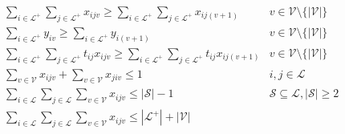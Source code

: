 \begin{eqnarray}
	    & \displaystyle\sum_{i\in \mathcal{L}^+}\displaystyle\sum_{j\in \mathcal{L}^+} x_{ijv} \geq \displaystyle\sum_{i\in \mathcal{L}^+}\displaystyle\sum_{j\in \mathcal{L}^+} x_{ij(v+1)} & v \in \mathcal{V} \setminus\{| \mathcal{V}|\} \label{eq:const_number_of_arcs}\\
	    & \displaystyle\sum_{i\in \mathcal{L}^+} y_{iv} \geq \displaystyle\sum_{i\in \mathcal{L}^+} y_{i(v+1)} & v \in \mathcal{V} \setminus\{| \mathcal{V}|\} \label{eq:const_number_of_visits} \\
	    & \displaystyle\sum_{i\in \mathcal{L}^+}\displaystyle\sum_{j\in \mathcal{L}^+} t_{ij}x_{ijv} \geq \displaystyle\sum_{i\in \mathcal{L}^+}\displaystyle\sum_{j\in \mathcal{L}^+} t_{ij}x_{ij(v+1)} & v \in \mathcal{V} \setminus\{| \mathcal{V}|\} \label{eq:const_total_time_used}\\
	    & \displaystyle\sum_{v\in \mathcal{V}} x_{ijv} + \displaystyle\sum_{v\in \mathcal{V}} x_{jiv} \leq 1 & i,j \in \mathcal{L} \label{eq:const_back_and_forth}\\
	    & \displaystyle\sum_{i\in \mathcal{L}} \displaystyle\sum_{j\in \mathcal{L}} \displaystyle\sum_{v\in \mathcal{V}} x_{ijv} \leq |\mathcal{S}|-1  & \mathcal{S} \subseteq \mathcal{L}, |\mathcal{S}|\geq 2 \label{eq:const_subtour_in_set}\\
	    & \displaystyle\sum_{i\in \mathcal{L}} \displaystyle\sum_{j\in \mathcal{L}} \displaystyle\sum_{v\in \mathcal{V}} x_{ijv}  \leq |\mathcal{L}^{+}| + |\mathcal{V}| \label{eq:const_arcs_less_then_locations}
\end{eqnarray}
\resumetocwriting

